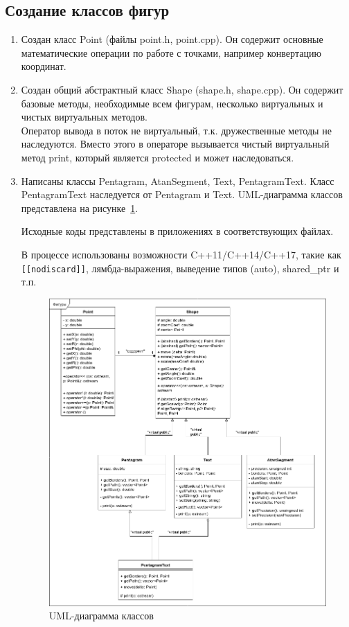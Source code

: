 \documentclass[a4paper, 14pt]{extarticle}
\begin{document}
\subsection{Создание классов фигур}
\begin{enumerate}
    \item Создан класс Point (файлы point.h, point.cpp). Он содержит основные математические операции по работе с точками, например конвертацию координат.
    \item Создан общий абстрактный класс Shape (shape.h, shape.cpp). Он содержит базовые методы, необходимые всем фигурам, несколько виртуальных и чистых виртуальных методов.\\
        Оператор вывода в поток не виртуальный, т.к. дружественные методы не наследуются. Вместо этого в операторе вызывается чистый виртуальный метод print, который является protected и может наследоваться.~\cite{idioms}
    \item Написаны классы Pentagram, AtanSegment, Text, PentagramText. Класс PentagramText наследуется от Pentagram и Text. UML-диаграмма классов представлена на рисунке~\ref{img:uml:shapes}.

    Исходные коды представлены в приложениях в соответствующих файлах.

    В процессе использованы возможности C++11/C++14/C++17, такие как \texttt{[[nodiscard]]}, лямбда-выражения, выведение типов (auto), shared\_ptr и т.п.~\cite{cppwiki}~\cite{moderncpp}
    \begin{figure}[h]
        \centering
        \includegraphics[width=\textwidth]{./img/classes_uml.png}
        \caption{UML-диаграмма классов}%
        \label{img:uml:shapes}
    \end{figure}
\end{enumerate}
\end{document}
